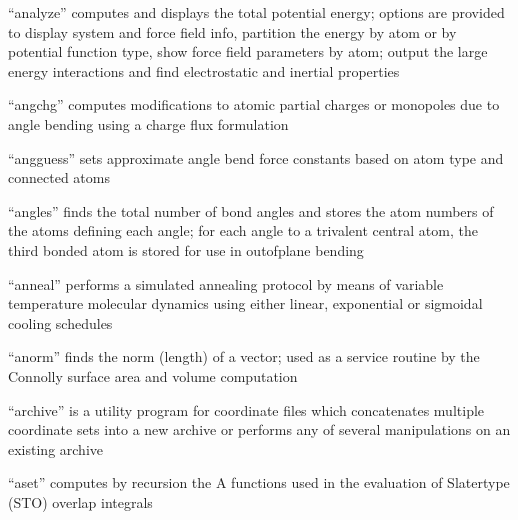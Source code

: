 \documentclass[letterpaper,11pt,english]{sphinxmanual}
\begin{document}

“analyze” computes and displays the total potential energy;
options are provided to display system and force field info,
partition the energy by atom or by potential function type,
show force field parameters by atom; output the large energy
interactions and find electrostatic and inertial properties


“angchg” computes modifications to atomic partial charges or
monopoles due to angle bending using a charge flux formulation


“angguess” sets approximate angle bend force constants based
on atom type and connected atoms


“angles” finds the total number of bond angles and stores
the atom numbers of the atoms defining each angle; for
each angle to a trivalent central atom, the third bonded
atom is stored for use in out\sphinxhyphen{}of\sphinxhyphen{}plane bending


“anneal” performs a simulated annealing protocol by means of
variable temperature molecular dynamics using either linear,
exponential or sigmoidal cooling schedules


“anorm” finds the norm (length) of a vector; used as a
service routine by the Connolly surface area and volume
computation







“archive” is a utility program for coordinate files which
concatenates multiple coordinate sets into a new archive or
performs any of several manipulations on an existing archive


“aset” computes by recursion the A functions used in the
evaluation of Slater\sphinxhyphen{}type (STO) overlap integrals
\end{document}
